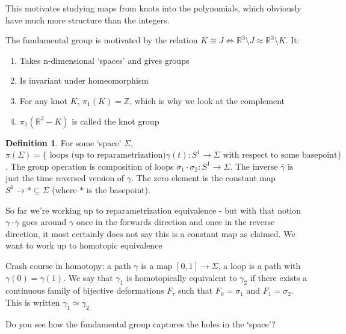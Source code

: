 \documentclass[11pt]{article}
\newcommand{\Z}{\mathbb{Z}}
\newcommand{\R}{\mathbb{R}}
\newcommand{\set}[1]{\{ #1 \}}
\theoremstyle{plain}
\theoremstyle{definition}
\newtheorem{definition}{Definition}
\begin{document}
This motivates studying maps from knots into the polynomials, which obviously have much more structure than the integers.

The fundamental group is motivated by the relation $K \cong J \iff \R^3 \setminus J \approx \R^3 \setminus K$. It:


\begin{enumerate}
  \item Takes n-dimensional `spaces' and gives groups
  \item Is invariant under homeomorphism
  \item For any knot $K$, $\pi_1(K) = \Z$, which is why we look at the complement
  \item $\pi_1(\R^3 - K)$ is called the knot group
\end{enumerate}


\begin{definition}
  For some `space' $\Sigma$, $\pi(\Sigma) = \set{\text{ loops (up to reparametrization)} \gamma(t): S^1 \to \Sigma \text{ with respect to some basepoint}}$. The group operation
  is composition of loops $\sigma_1 \cdot \sigma_2 : S^1 \to \Sigma$. The inverse $\bar{\gamma}$ is just the time reversed version of $\gamma$. The zero element is the
  constant map $S^1 \to \ast \subseteq \Sigma$ (where $\ast$ is the  basepoint).

  So far we're working up to reparametrization equivalence - but with that notion $\gamma \cdot \bar{\gamma}$ goes around $\gamma$ once in the forwards direction and once
  in the reverse direction, it most certainly does not say this is a constant map as claimed. We want to work up to homotopic equivalence

  Crash course in homotopy: a path $\gamma$ is a map $[0, 1] \to \Sigma $, a loop is a path with $\gamma(0) = \gamma(1)$.
  We say that $\gamma_1$ is homotopically equivalent to $\gamma_2$ if there exists a continuous family of bijective deformations $F_\tau$ such that $F_0 = \sigma_1$
  and $F_1 = \sigma_2$. This is written $\gamma_1 \simeq \gamma_2$

  Do you see how the fundamental group captures the holes in the `space'?
\end{definition}
\end{document}
